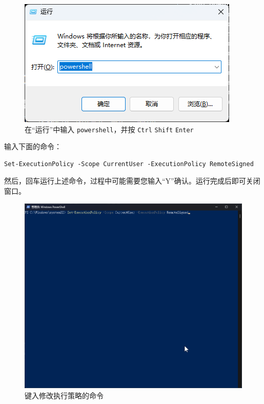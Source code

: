 \begin{figure}[H]
    \Centering
    \includegraphics[width=\textwidth]{docs/assets/run_pwsh_as_admin.png}
    \caption{在“运行”中输入 \lstinline{powershell}，并按 \lstinline{Ctrl} \lstinline{Shift} \lstinline{Enter}}
\end{figure}

输入下面的命令：

\begin{verbatim}
Set-ExecutionPolicy -Scope CurrentUser -ExecutionPolicy RemoteSigned
\end{verbatim}

然后，回车运行上述命令，过程中可能需要您输入“Y”确认。运行完成后即可关闭窗口。

\begin{figure}[H]
    \Centering
    \includegraphics[width=\textwidth]{docs/assets/confirm_execution_policy_00.png}
    \caption{键入修改执行策略的命令}
\end{figure}

